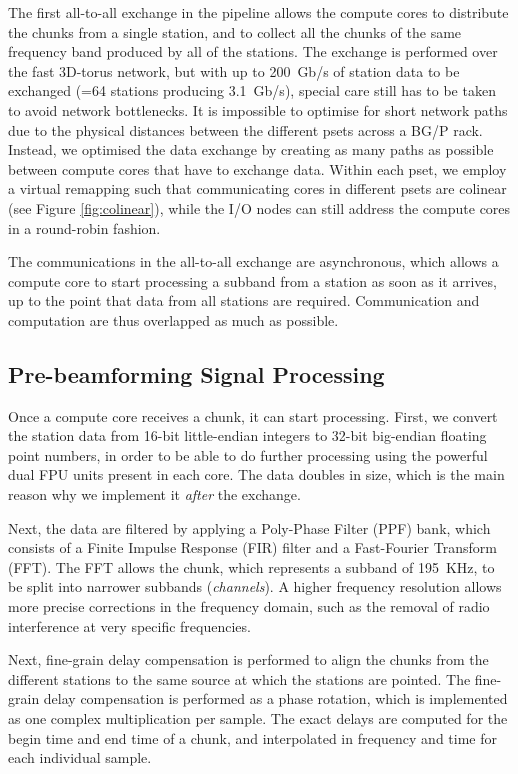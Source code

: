 \documentclass{llncs}
\begin{document}
The first all-to-all exchange in the pipeline allows the compute cores to distribute the chunks from a single station, and to collect all the chunks of the same frequency band produced by all of the stations. The exchange is performed over the fast 3D-torus network, but with up to 200~Gb/s of station data to be exchanged (=64 stations producing 3.1~Gb/s), special care still has to be taken to avoid network bottlenecks. It is impossible to optimise for short network paths due to the physical distances between the different psets across a BG/P rack. Instead, we optimised the data exchange by creating as many paths as possible between compute cores that have to exchange data. Within each pset, we employ a virtual remapping such that communicating cores in different psets are colinear (see Figure \ref{fig:colinear}), while the I/O nodes can still address the compute cores in a round-robin fashion.

The communications in the all-to-all exchange are asynchronous, which allows a compute core to start processing a subband from a station as soon as it arrives, up to the point that data from all stations are required. Communication and computation are thus overlapped as much as possible.

\subsection{Pre-beamforming Signal Processing}

Once a compute core receives a chunk, it can start processing. First, we convert the station data from 16-bit little-endian integers to 32-bit big-endian floating point numbers, in order to be able to do further processing using the powerful dual FPU units present in each core. The data doubles in size, which is the main reason why we implement it \emph{after} the exchange.

Next, the data are filtered by applying a Poly-Phase Filter (PPF) bank, which consists of a Finite Impulse Response (FIR) filter and a Fast-Fourier Transform (FFT). The FFT allows the chunk, which represents a subband of 195~KHz, to be split into narrower subbands (\emph{channels}). A higher frequency resolution allows more precise corrections in the frequency domain, such as the removal of radio interference at very specific frequencies.

Next, fine-grain delay compensation is performed to align the chunks from the different stations to the same source at which the stations are pointed. The fine-grain delay compensation is performed as a phase rotation, which is implemented as one complex multiplication per sample. The exact delays are computed for the begin time and end time of a chunk, and interpolated in frequency and time for each individual sample. %
\end{document}
